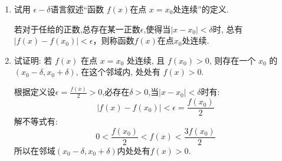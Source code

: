 \begin{questions}
\begin{enumerate}[label=(\arabic*)]
\begin{solution}
		      \end{solution}

	\end{enumerate}

	\question[10]
	\begin{enumerate}[label=(\arabic*)]
		\item 试用 \( \epsilon - \delta \)语言叙述\enquote{函数 \( f(x) \)在点 \( x = x_0 \)处连续}的定义.
		      \begin{solution}
			      若对于任给的正数,总存在某一正数$\epsilon$,使得当$|x-x_0|<\delta$时, 总有$|f(x)-f(x_0)| <
				      \epsilon$，则称函数$f(x)$在点$x_0$处连续.
		      \end{solution}
		\item 试证明: 若 $f(x)$ 在点 $x = x_0$ 处连续, 且 $f(x_0) > 0$, 则存在一个 $x_0$ 的 $(x_0 − \delta, x_0 + \delta)$, 在这个邻域内, 处处有 $f(x) > 0$.
		      \begin{proofsolution}
			      根据定义设$\epsilon=\frac{f(x)}{2}>0$,必存在$\delta>0$,当$|x-x_0|<\delta$时有:
			      \begin{equation*}
				      |f(x) - f(x_0)| < \epsilon = \frac{f(x_0)}{2}
			      \end{equation*}
			      解不等式有:
			      \begin{equation*}
				      0 < \frac{f(x_0)}{2} < f(x) < \frac{3f(x_0)}{2}
			      \end{equation*}
			      所以在邻域$(x_0-\delta, x_0 + \delta)$内处处有$f(x)>0$.
		      \end{proofsolution}
	\end{enumerate}

\end{questions}
